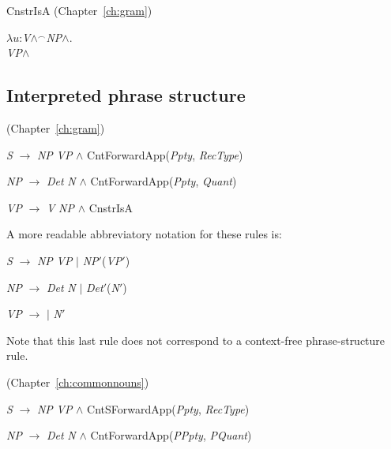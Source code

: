 CnstrIsA (Chapter~\ref{ch:gram})

$\lambda
u$:\textit{V}\d{$\wedge$}$^{\frown}$\textit{NP}\d{$\wedge$}. \\
\hspace*{1em}
\textit{VP}\d{$\wedge$}

\subsection{Interpreted phrase structure}
\label{app:interpps}

(Chapter~\ref{ch:gram})

\textit{S} $\longrightarrow$ \textit{NP} \textit{VP} \d{\d{$\wedge$}}
CntForwardApp(\textit{Ppty}, \textit{RecType}) 

\textit{NP} $\longrightarrow$ \textit{Det} \textit{N} \d{\d{$\wedge$}}
CntForwardApp(\textit{Ppty}, \textit{Quant}) 

\textit{VP} $\longrightarrow$ \textit{V} \textit{NP} \d{\d{$\wedge$}}
CnstrIsA

A more readable abbreviatory notation for these rules is:

\textit{S} $\longrightarrow$ \textit{NP} \textit{VP} $\mid$
\textit{NP}$'$(\textit{VP}$'$)

\textit{NP} $\longrightarrow$ \textit{Det} \textit{N} $\mid$
\textit{Det}$'$(\textit{N}$'$)

\textit{VP} $\longrightarrow$ 
 $\mid$
\textit{N}$'$

Note that this last rule does not correspond to a context-free
phrase-structure rule.

(Chapter~\ref{ch:commonnouns})

\textit{S} $\longrightarrow$ \textit{NP} \textit{VP} \d{\d{$\wedge$}}
CntSForwardApp(\textit{Ppty}, \textit{RecType}) 

\textit{NP} $\longrightarrow$ \textit{Det} \textit{N} \d{\d{$\wedge$}}
CntForwardApp(\textit{PPpty}, \textit{PQuant}) 

